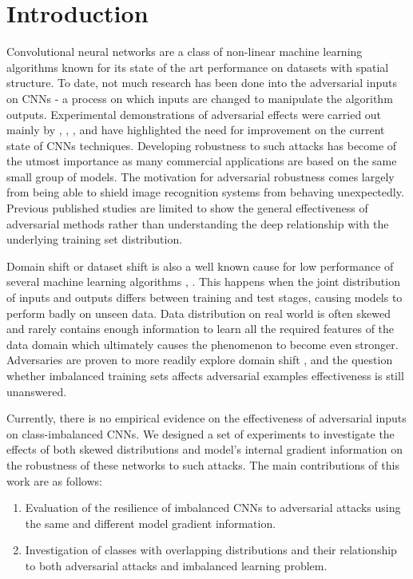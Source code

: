 \documentclass[runningheads,a4paper]{llncs}
\begin{document}
\section{Introduction}


Convolutional neural networks are a class of non-linear machine learning algorithms known for its state of the art performance on datasets with spatial structure. To date, not much research has been done into the adversarial inputs on CNNs - a process on which inputs are changed to manipulate the algorithm outputs. Experimental demonstrations of adversarial effects were carried out mainly by \cite{billovits}, \cite{goodfellow2014}, \cite{goodfellow2016}, \cite{papernot2016} and have highlighted the need for improvement on the current state of CNNs techniques. Developing robustness to such attacks has become of the utmost importance as many commercial applications are based on the same small group of models. The motivation for adversarial robustness comes largely from being able to shield image recognition systems from behaving unexpectedly. Previous published studies are limited to show the general effectiveness of adversarial methods rather than understanding the deep relationship with the underlying training set distribution. 

Domain shift or dataset shift \cite{Quionero} is also a well known cause for low performance of several machine learning algorithms \cite{japkowicz2002class}, \cite{krawczyk2016learning}. This happens when the joint distribution of inputs and outputs differs between training and test stages, causing models to perform badly on unseen data. Data distribution on real world is often skewed and rarely contains enough information to learn all the required features of the data domain which ultimately causes the phenomenon to become even stronger. Adversaries are proven to more readily explore domain shift \cite{lowd2005}, \cite{Laskov2010} and the question whether imbalanced training sets affects adversarial examples effectiveness is still unanswered. 

Currently, there is no empirical evidence on the effectiveness of adversarial inputs on class-imbalanced CNNs. We designed a set of experiments to investigate the effects of both skewed distributions and model's internal gradient information on the robustness of these networks to such attacks. The main contributions of this work are as follows: 
\begin{enumerate}
\item Evaluation of the resilience of imbalanced CNNs to adversarial attacks using the same and different model gradient information.
\item Investigation of classes with overlapping distributions and their relationship to both adversarial attacks and imbalanced learning problem.
\end{enumerate}
\end{document}
